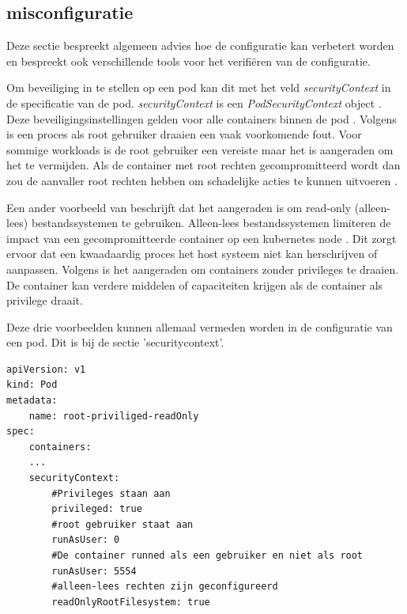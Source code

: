 \subsection{misconfiguratie}
Deze sectie bespreekt algemeen advies hoe de configuratie kan verbetert worden en bespreekt ook verschillende tools voor het verifiëren van de configuratie.\newline

Om beveiliging in te stellen op een pod kan dit met het veld \textit{securityContext} in de specificatie van de pod. \textit{securityContext} is een \textit{PodSecurityContext} object \autocite{KubernetesDocs-2023}. 
Deze beveiligingsinstellingen gelden voor alle containers binnen de pod \autocite{KubernetesDocs-2023}. 
Volgens \textcite{OWASP-2023} is een proces als root gebruiker draaien een vaak voorkomende fout. Voor sommige workloads is de root gebruiker een vereiste maar het is aangeraden om het te vermijden. Als de container met root rechten gecompromitteerd wordt dan zou de aanvaller root rechten hebben om schadelijke acties te kunnen uitvoeren \autocite{OWASP-2023}.  \newline

Een ander voorbeeld van \textcite{OWASP-2023} beschrijft dat het aangeraden is om read-only (alleen-lees) bestandssystemen te gebruiken. Alleen-lees bestandssystemen limiteren de impact van een gecompromitteerde container op een kubernetes node \autocite{OWASP-2023}. Dit zorgt ervoor dat een kwaadaardig proces het host systeem niet kan herschrijven of aanpassen. Volgens \textcite{OWASP-2023} is het aangeraden om containers zonder privileges te draaien. De container kan verdere middelen of capaciteiten krijgen als de container als privilege draait. \newline

Deze drie voorbeelden kunnen allemaal vermeden worden in de configuratie van een pod. Dit is bij de sectie 'securitycontext'. 
\begin{lstlisting}
apiVersion: v1  
kind: Pod  
metadata:  
    name: root-priviliged-readOnly
spec:  
    containers:  
    ...
    securityContext:  
        #Privileges staan aan 
        privileged: true
        #root gebruiker staat aan
        runAsUser: 0
        #De container runned als een gebruiker en niet als root
        runAsUser: 5554
        #alleen-lees rechten zijn geconfigureerd
        readOnlyRootFilesystem: true
\end{lstlisting}


